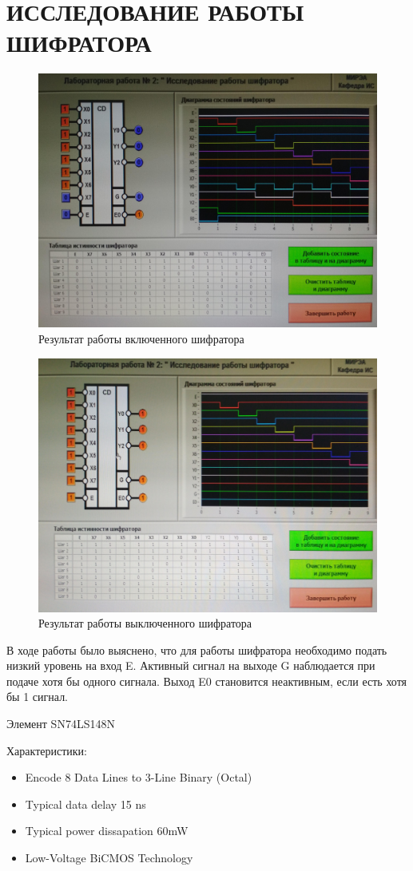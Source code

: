\section{ИССЛЕДОВАНИЕ РАБОТЫ ШИФРАТОРА}

\begin{figure}[H]
	\centering
	\includegraphics[width=0.95\linewidth]{imgs/2/1}
	\caption{Результат работы включенного шифратора}
	\label{fig:2_on}
\end{figure}

\begin{figure}[H]
	\centering
	\includegraphics[width=0.95\linewidth]{imgs/2/2}
	\caption{Результат работы выключенного шифратора}
	\label{fig:2_off}
\end{figure}

В ходе работы было выяснено, что для работы шифратора необходимо подать низкий уровень на вход E.
Активный сигнал на выходе G наблюдается при подаче хотя бы одного сигнала.
Выход E0 становится неактивным, если есть хотя бы 1 сигнал.

Элемент SN74LS148N

Характеристики:
\begin{itemize}
	\item Encode 8 Data Lines to 3-Line Binary (Octal)
	\item Typical data delay 15 ns
	\item Typical power dissapation 60mW
	\item Low-Voltage BiCMOS Technology
\end{itemize}